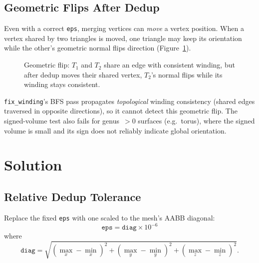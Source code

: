 \documentclass[11pt]{article}
\begin{document}
\subsection{Geometric Flips After Dedup}

Even with a correct \texttt{eps}, merging vertices can \emph{move} a
vertex position.  When a vertex shared by two triangles is moved, one
triangle may keep its orientation while the other's geometric normal
flips direction (Figure~\ref{fig:flip}).

\begin{figure}[h]
\centering
{}
\caption{Geometric flip: $T_1$ and $T_2$ share an edge with
consistent winding, but after dedup moves their shared vertex,
$T_2$'s normal flips while its winding stays consistent.}
\label{fig:flip}
\end{figure}

\texttt{fix\_winding}'s BFS pass propagates \emph{topological} winding
consistency (shared edges traversed in opposite directions), so it
cannot detect this geometric flip.  The signed-volume test also fails
for genus~$>0$ surfaces (e.g.\ torus), where the signed volume is
small and its sign does not reliably indicate global orientation.

\section{Solution}

\subsection{Relative Dedup Tolerance}

Replace the fixed \texttt{eps} with one scaled to the mesh's AABB
diagonal:
\[
  \texttt{eps} = \texttt{diag} \times 10^{-6}
\]
where
\[
  \texttt{diag} = \sqrt{(\max_x - \min_x)^2 + (\max_y - \min_y)^2 + (\max_z - \min_z)^2}.
\]
\end{document}
